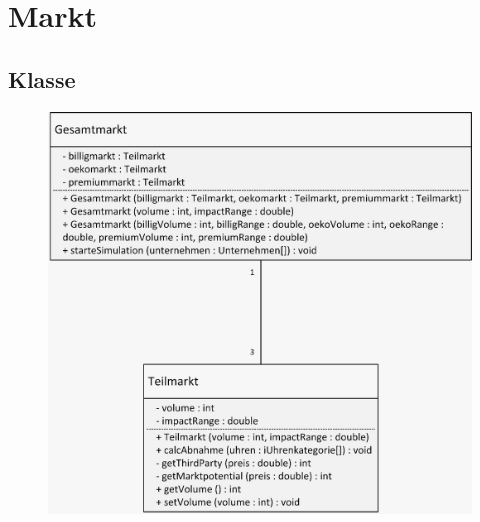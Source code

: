 \clearpage
\chapter{Markt}
\section{Klasse}
\begin{figure} [!h]
	\centering
	\includegraphics[scale=0.3]{img/Markt.png} 
\end{figure}
\clearpage
